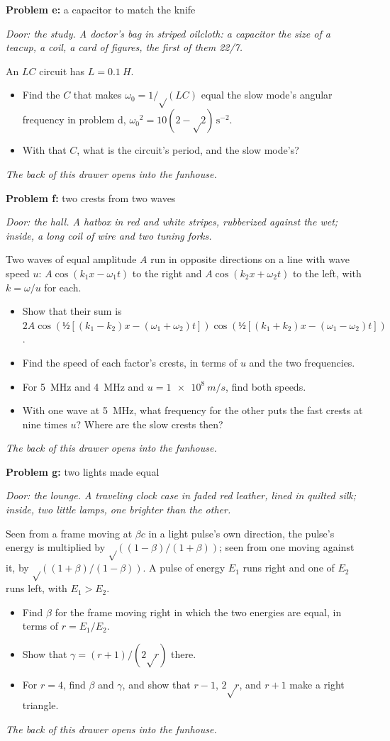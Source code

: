 \documentclass[11pt]{article}
\newcommand{\scene}[1]{\par{\itshape #1}\par}
\newcommand{\problem}[2]{\par\medskip\textbf{Problem #1:} #2\par\nopagebreak}
\newenvironment{parts}{\begin{itemize}[leftmargin=3.4em,labelwidth=2.8em,labelsep=0.6em,align=left,itemsep=2pt,topsep=3pt]}{\end{itemize}}
\newcommand{\pt}[1]{\item[\textbf{#1}]}
\newcommand{\half}{\text{½}}  %
\newcommand{\rt}{\text{√}}  %
\begin{document}
\problem{e}{a capacitor to match the knife}
\scene{Door: the study. A doctor's bag in striped oilcloth: a capacitor the size of a teacup, a coil, a card of figures, the first of them 22/7.}
An $LC$ circuit has $L = \SI{0.1}{H}$.
\begin{parts}
\pt{e-1} Find the $C$ that makes $\omega_0 = 1/\rt(LC)$ equal the slow mode's angular frequency in problem d, $\omega_0{}^2 = 10(2 - \rt2)\,\mathrm{s^{-2}}$.
\pt{e-2} With that $C$, what is the circuit's period, and the slow mode's?
\end{parts}
\scene{The back of this drawer opens into the funhouse.}

\problem{f}{two crests from two waves}
\scene{Door: the hall. A hatbox in red and white stripes, rubberized against the wet; inside, a long coil of wire and two tuning forks.}
Two waves of equal amplitude $A$ run in opposite directions on a line with wave speed $u$: $A\cos(k_1x - \omega_1t)$ to the right and $A\cos(k_2x + \omega_2t)$ to the left, with $k = \omega/u$ for each.
\begin{parts}
\pt{f-1} Show that their sum is $2A\cos(\half[(k_1 - k_2)x - (\omega_1 + \omega_2)t])\cos(\half[(k_1 + k_2)x - (\omega_1 - \omega_2)t])$.
\pt{f-2} Find the speed of each factor's crests, in terms of $u$ and the two frequencies.
\pt{f-3} For \SI{5}{MHz} and \SI{4}{MHz} and $u = \SI{1e8}{m/s}$, find both speeds.
\pt{f-4} With one wave at \SI{5}{MHz}, what frequency for the other puts the fast crests at nine times $u$? Where are the slow crests then?
\end{parts}
\scene{The back of this drawer opens into the funhouse.}

\problem{g}{two lights made equal}
\scene{Door: the lounge. A traveling clock case in faded red leather, lined in quilted silk; inside, two little lamps, one brighter than the other.}
Seen from a frame moving at $\beta c$ in a light pulse's own direction, the pulse's energy is multiplied by $\rt((1 - \beta)/(1 + \beta))$; seen from one moving against it, by $\rt((1 + \beta)/(1 - \beta))$. A pulse of energy $E_1$ runs right and one of $E_2$ runs left, with $E_1 > E_2$.
\begin{parts}
\pt{g-1} Find $\beta$ for the frame moving right in which the two energies are equal, in terms of $r = E_1/E_2$.
\pt{g-2} Show that $\gamma = (r + 1)/(2\rt r)$ there.
\pt{g-3} For $r = 4$, find $\beta$ and $\gamma$, and show that $r - 1$, $2\rt r$, and $r + 1$ make a right triangle.
\end{parts}
\scene{The back of this drawer opens into the funhouse.}
\end{document}
